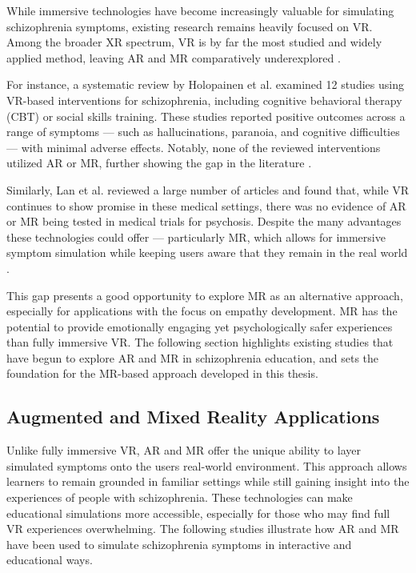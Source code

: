 While immersive technologies have become increasingly valuable for simulating schizophrenia symptoms, existing research remains heavily focused on VR. Among the broader XR spectrum, VR is by far the most studied and widely applied method, leaving AR and MR comparatively underexplored \cite{Kuhail2022}.

For instance, a systematic review by Holopainen et al. examined 12 studies using VR-based interventions for schizophrenia, including cognitive behavioral therapy (CBT) or social skills training. These studies reported positive outcomes across a range of symptoms — such as hallucinations, paranoia, and cognitive difficulties — with minimal adverse effects. Notably, none of the reviewed interventions utilized AR or MR, further showing the gap in the literature \cite{Holopainen2023}.

\vspace{1em}

Similarly, Lan et al. reviewed a large number of articles and found that, while VR continues to show promise in these medical settings, there was no evidence of AR or MR being tested in medical trials for psychosis. Despite the many advantages these technologies could offer — particularly MR, which allows for immersive symptom simulation while keeping users aware that they remain in the real world \cite{Lan2023}.

This gap presents a good opportunity to explore MR as an alternative approach, especially for applications with the focus on empathy development. MR has the potential to provide emotionally engaging yet psychologically safer experiences than fully immersive VR. The following section highlights existing studies that have begun to explore AR and MR in schizophrenia education, and sets the foundation for the MR-based approach developed in this thesis.

\subsection{Augmented and Mixed Reality Applications}

Unlike fully immersive VR, AR and MR offer the unique ability to layer simulated symptoms onto the users real-world environment. This approach allows learners to remain grounded in familiar settings while still gaining insight into the experiences of people with schizophrenia. These technologies can make educational simulations more accessible, especially for those who may find full VR experiences overwhelming. The following studies illustrate how AR and MR have been used to simulate schizophrenia symptoms in interactive and educational ways.

